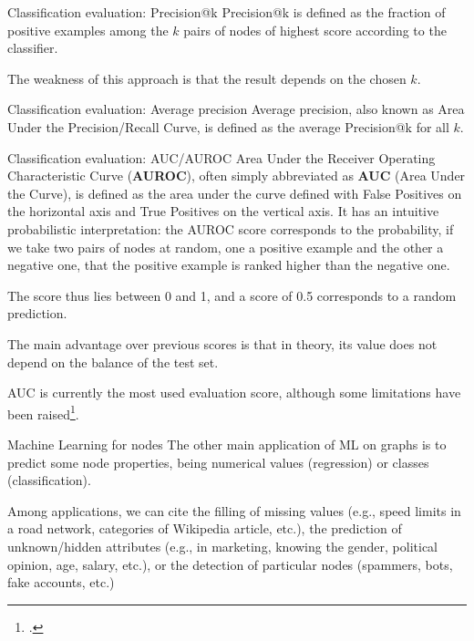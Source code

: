 \documentclass[a4paper,11pt]{book}
\begin{document}
\begin{textbox}{Classification evaluation: Precision@k}
Precision@k is defined as the fraction of positive examples among the $k$ pairs of nodes of highest score according to the classifier.

The weakness of this approach is that the result depends on the chosen $k$. 
\end{textbox}




\begin{textbox}{Classification evaluation: Average precision}
Average precision, also known as Area Under the Precision/Recall Curve, is defined as the average Precision@k for all $k$.
\end{textbox}



\begin{textbox}{Classification evaluation: AUC/AUROC}
Area Under the Receiver Operating Characteristic Curve (\textbf{AUROC}), often simply abbreviated as \textbf{AUC} (Area Under the Curve), is defined as the area under the curve defined with False Positives on the horizontal axis and True Positives on the vertical axis. 
It has an intuitive probabilistic interpretation: the AUROC score corresponds to the probability, if we take two pairs of nodes at random, one a positive example and the other a negative one, that the positive example is ranked higher than the negative one. 

The score thus lies between 0 and 1, and a score of 0.5 corresponds to a random prediction.

The main advantage over previous scores is that in theory, its value does not depend on the balance of the test set.

AUC is currently the most used evaluation score, although some limitations have been raised\footcite{yang2015evaluating}.
\end{textbox}




\begin{textbox}{Machine Learning for nodes}
The other main application of ML on graphs is to predict some node properties, being numerical values (regression) or classes (classification).

Among applications, we can cite the filling of missing values (e.g., speed limits in a road network, categories of Wikipedia article, etc.), the prediction of unknown/hidden attributes (e.g., in marketing, knowing the gender, political opinion, age, salary, etc.), or the detection of particular nodes (spammers, bots, fake accounts, etc.)


\end{textbox}
\end{document}
